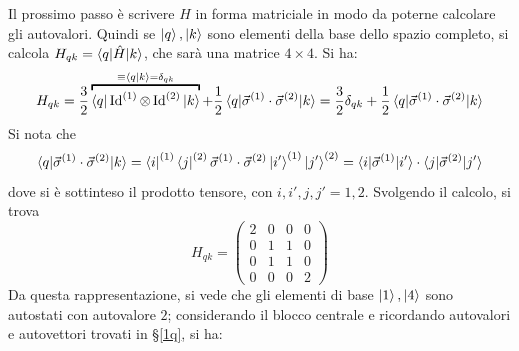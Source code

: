 \documentclass[11pt, a4paper]{scrartcl} %
\numberwithin{equation}{subsection}
\theoremstyle{style2}
\theoremstyle{style1}
\begin{document}
Il prossimo passo \`e scrivere $\hat{H}$ in forma matriciale in modo da poterne calcolare gli autovalori.
Quindi se $\ket{q} , \ket{k} $ sono elementi della base dello spazio completo, si calcola $H_{qk} =\braket{q|\hat{H}|k} $, che sar\`a una matrice $4\times 4$.
Si ha:
\[
	H_{qk} =\frac{3}{2} \overbracket{\braket{q|\operatorname{Id} ^{(1) } \otimes \operatorname{Id} ^{(2)} |k} }^{\equiv \braket{q|k} = \delta _{qk} } + \frac{1}{2} \braket{q|\vec{\sigma }^{(1)} \cdot \vec{\sigma }^{(2)} |k} =  \frac{3}{2}\delta _{qk} + \frac{1}{2} \braket{q|\vec{\sigma }^{(1)} \cdot \vec{\sigma }^{(2)} |k}  
\] 
Si nota che 
\[
\braket{q|\vec{\sigma }^{(1)} \cdot \vec{\sigma }^{(2)} |k}  = \bra{i} ^{(1)} \bra{j} ^{(2)} \vec{\sigma }^{(1)} \cdot \vec{\sigma }^{(2)} \ket{i'} ^{(1)} \ket{j'} ^{(2)} = \braket{i|\vec{\sigma }^{(1)} |i'}\cdot  \braket{j|\vec{\sigma }^{(2)} |j'} 
\] 
dove si \`e sottinteso il prodotto tensore, con $i,i',j,j' = 1,2$.
Svolgendo il calcolo, si trova
\[
	H_{qk} = \begin{pmatrix} 2 & 0 &0 &0\\ 0&1&1&0\\0&1&1&0 \\ 0&0&0&2\end{pmatrix} 
\] 
Da questa rappresentazione, si vede che gli elementi di base $\ket{1} , \ket{4} $ sono autostati con autovalore $2$; considerando il blocco centrale e ricordando autovalori e autovettori trovati in \S\ref{1q}, si ha:
\end{document}
